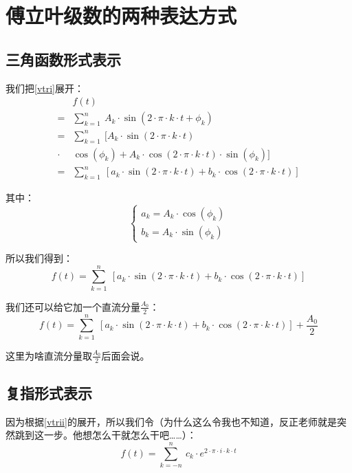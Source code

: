 \section{傅立叶级数的两种表达方式}
\subsection{三角函数形式表示}
我们把\ref{vtri}展开：
\begin{align*}
	      & f(t)                                                                                                   \\
	=     & \sum\limits_{k=1}^n\ A_k\cdot \sin(2\cdot\pi\cdot k\cdot t+\phi_k)                                     \\
	=     & \sum\limits_{k=1}^n\ [A_k\cdot \sin(2\cdot\pi\cdot k\cdot t)                                           \\
	\cdot & \cos(\phi_k)+A_k\cdot \cos(2\cdot \pi\cdot k\cdot t)\cdot \sin(\phi_k)]                                \\
	=     & \sum\limits_{k=1}^n\ [a_k\cdot \sin(2\cdot\pi\cdot k\cdot t) +b_k\cdot \cos(2\cdot \pi\cdot k\cdot t)]
\end{align*}

其中：
$$
	\left\{
	\begin{array}{lr}
		a_k=A_k\cdot \cos(\phi_k) \\
		b_k=A_k\cdot \sin(\phi_k)
	\end{array}
	\right.
$$

所以我们得到：
\begin{equation}
	f(t) =\sum\limits_{k=1}^n\ [a_k\cdot \sin(2\cdot\pi\cdot k\cdot t) +b_k\cdot \cos(2\cdot \pi\cdot k\cdot t)]
\end{equation}

我们还可以给它加一个直流分量$\frac{A_0}{2}$：
\begin{equation}\label{vtrii}
	f(t) =\sum\limits_{k=1}^n\ [a_k\cdot \sin(2\cdot\pi\cdot k\cdot t) +b_k\cdot \cos(2\cdot \pi\cdot k\cdot t)]+\frac{A_0}{2}
\end{equation}

这里为啥直流分量取$\frac{A_0}{2}$后面会说。
\subsection{复指形式表示}
因为根据\eqref{vtrii}的展开，所以我们令（为什么这么令我也不知道，反正老师就是突然跳到这一步。他想怎么干就怎么干吧……）：
\begin{equation}
	f(t)=\sum\limits_{k=-n}^n\ c_k\cdot e^{2\cdot \pi \cdot i \cdot k \cdot t}
\end{equation}

